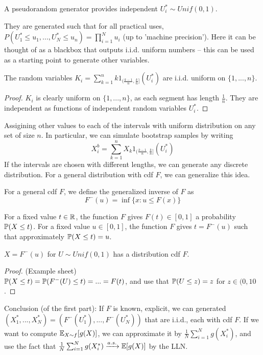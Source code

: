 \documentclass[a4paper]{article}
\begin{document}
\begin{defi}
A pseudorandom generator provides independent $U_i^{*} \sim Unif(0,1)$.
\end{defi}

\begin{rem}
They are generated such that for all practical uses, $P(U_1^* \leq u_1,...,U_N^* \leq u_n) = \prod_{i=1}^N u_i$ (up to 'machine precision'). Here it can be thought of as a blackbox that outputs i.i.d. uniform numbers -- this can be used as a starting point to generate other variables.
\end{rem}

\begin{prop}
The random variables $K_i = \sum_{k=1}^n k 1_{(\frac{k-1}{n},\frac{k}{n}]} (U_i^*)$ are i.i.d. uniform on $\{1,...,n\}$.
\begin{proof}
$K_i$ is clearly uniform on $\{1,...,n\}$, as each segment has length $\frac{1}{n}$. They are independent as functions of independent random variables $U_i^*$. 
\end{proof}
\end{prop}
\begin{rem}
Assigining other values to each of the intervals with uniform distribution on any set of size $n$. In particular, we can simulate bootstrap samples by writing $$X_i^b = \sum_{k=1}^n X_k 1_{(\frac{k-1}{n},\frac{k}{n}]} (U_i^*)$$ If the intervals are chosen with different lengths, we can generate any discrete distribution. For a general distribution with cdf $F$, we can generalize this idea.
\end{rem}

\begin{defi}
For a general cdf $F$, we define the generalized inverse of $F$ as $$F^-(u) = \inf \{x: u \leq F(x)\}$$
\end{defi}

\begin{rem}
For a fixed value $t \in \R$, the function $F$ gives $F(t) \in [0,1]$ a probability $\P(X \leq t)$. For a fixed value $u \in [0,1]$, the function $F$ gives $t = F^- (u)$ such that approximately $\P(X \leq t) = u$.
\end{rem}

\begin{prop}
$X = F^-(u)$ for $U \sim Unif (0,1)$ has a distribution cdf $F$.
\begin{proof} (Example sheet)\\
$\P(X \leq t) = \P(F^-(U) \leq t) = ... = F(t)$, and use that $\P(U \leq z) = z$ for $z \in (0,10$.
\end{proof}
\end{prop}
Conclusion (of the first part): If $F$ is known, explicit, we can generated $(X_1^*,...,X_N^*) = (F^-(U_1^*),...,F^-(U_N^*))$ that are i.i.d., each with cdf $F$. If we want to compute $\E_{X \sim f} [g(X)]$, we can approximate it by $\frac{1}{N} \sum_{i=1}^N g(X_i^*)$, and use the fact that $\frac{1}{N} \sum_{i=1}^N g(X_i^*) \xrightarrow{a.s.} \E[g(X)]$ by the LLN.
\end{document}
